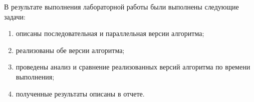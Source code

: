 
В результате выполнения лабораторной работы были выполнены следующие задачи:
\begin{enumerate}
\item описаны последовательная и параллельная версии алгоритма;
\item реализованы обе версии алгоритма;
\item проведены анализ и сравнение реализованных версий алгоритма по времени выполнения;
\item полученные результаты описаны в отчете.
\end{enumerate}
